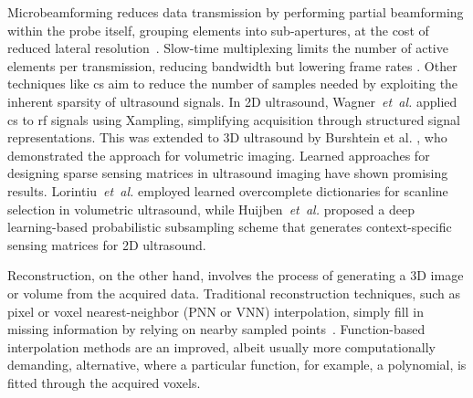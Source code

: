\documentclass[journal,twoside,web,dvipsnames]{ieeecolor}          %
\begin{document}
Microbeamforming reduces data transmission by performing partial beamforming within the probe itself, grouping elements into sub-apertures, at the cost of reduced lateral resolution~\cite{castrignano2025impact}. Slow-time multiplexing limits the number of active elements per transmission, reducing bandwidth but lowering frame rates \cite{rezvanitabar2022integrated}. Other techniques like \acrfull{cs} aim to reduce the number of samples needed by exploiting the inherent sparsity of ultrasound signals. In 2D ultrasound, Wagner~\emph{et~al.} \cite{wagner2012compressed} applied \acrshort{cs} to \acrfull{rf} signals using Xampling, simplifying acquisition through structured signal representations. This was extended to 3D ultrasound by Burshtein et al. \cite{burshtein2016sub}, who demonstrated the approach for volumetric imaging. Learned approaches for designing sparse sensing matrices in ultrasound imaging have shown promising results. Lorintiu~\emph{et~al.} \cite{lorintiu2015compressed} employed learned overcomplete dictionaries for scanline selection in volumetric ultrasound, while Huijben~\emph{et~al.} \cite{huijben2020learning} proposed a deep learning-based probabilistic subsampling scheme that generates context-specific sensing matrices for 2D ultrasound.

Reconstruction, on the other hand, involves the process of generating a 3D image or volume from the acquired data. Traditional reconstruction techniques, such as pixel or voxel nearest-neighbor (PNN or VNN) interpolation, simply fill in missing information by relying on nearby sampled points~\cite{ji2011real, huang2017review}. Function-based interpolation methods are an improved, albeit usually more computationally demanding, alternative, where a particular function, for example, a polynomial, is fitted through the acquired voxels.
\end{document}
